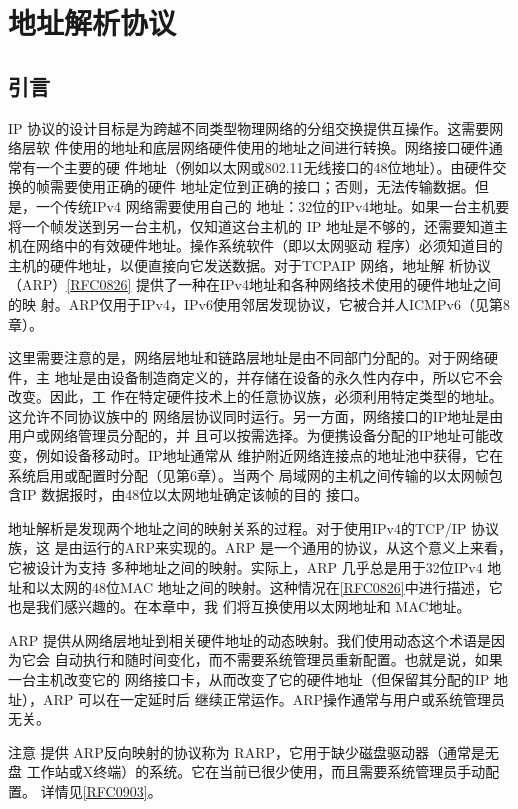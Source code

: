 \chapter{地址解析协议}

\section{引言}

IP 协议的设计目标是为跨越不同类型物理网络的分组交换提供互操作。这需要网络层软
件使用的地址和底层网络硬件使用的地址之间进行转换。网络接口硬件通常有一个主要的硬
件地址（例如以太网或802.11无线接口的48位地址）。由硬件交换的帧需要使用正确的硬件
地址定位到正确的接口；否则，无法传输数据。但是，一个传统IPv4 网络需要使用自己的
地址：32位的IPv4地址。如果一台主机要将一个帧发送到另一台主机，仅知道这台主机的
IP 地址是不够的，还需要知道主机在网络中的有效硬件地址。操作系统软件（即以太网驱动
程序）必须知道目的主机的硬件地址，以便直接向它发送数据。对于TCPAIP 网络，地址解
析协议（ARP）\href{https://www.rfc-editor.org/rfc/rfc0826}{[RFC0826]} 提供了一种在IPv4地址和各种网络技术使用的硬件地址之间的映
射。ARP仅用于IPv4，IPv6使用邻居发现协议，它被合并人ICMPv6（见第8章）。

这里需要注意的是，网络层地址和链路层地址是由不同部门分配的。对于网络硬件，主
地址是由设备制造商定义的，并存储在设备的永久性内存中，所以它不会改变。因此，工
作在特定硬件技术上的任意协议族，必须利用特定类型的地址。这允许不同协议族中的
网络层协议同时运行。另一方面，网络接口的IP地址是由用户或网络管理员分配的，并
且可以按需选择。为便携设备分配的IP地址可能改变，例如设备移动时。IP地址通常从
维护附近网络连接点的地址池中获得，它在系统启用或配置时分配（见第6章）。当两个
局域网的主机之间传输的以太网帧包含IP 数据报时，由48位以太网地址确定该帧的目的
接口。

地址解析是发现两个地址之间的映射关系的过程。对于使用IPv4的TCP/IP 协议族，这
是由运行的ARP来实现的。ARP 是一个通用的协议，从这个意义上来看，它被设计为支持
多种地址之间的映射。实际上，ARP 几乎总是用于32位IPv4 地址和以太网的48位MAC
地址之间的映射。这种情况在\href{https://www.rfc-editor.org/rfc/rfc0826}{[RFC0826]}中进行描述，它也是我们感兴趣的。在本章中，我
们将互换使用以太网地址和 MAC地址。

ARP 提供从网络层地址到相关硬件地址的动态映射。我们使用动态这个术语是因为它会
自动执行和随时间变化，而不需要系统管理员重新配置。也就是说，如果一台主机改变它的
网络接口卡，从而改变了它的硬件地址（但保留其分配的IP 地址），ARP 可以在一定延时后
继续正常运作。ARP操作通常与用户或系统管理员无关。

注意 提供 ARP反向映射的协议称为 RARP，它用于缺少磁盘驱动器（通常是无盘
工作站或X终端）的系统。它在当前已很少使用，而且需要系统管理员手动配置。
详情见\href{https://www.rfc-editor.org/rfc/rfc0903}{[RFC0903]}。

